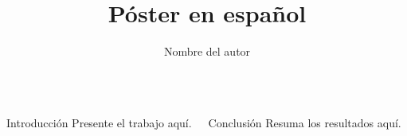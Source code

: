 \documentclass{beamer}
\title{Póster en español}
\author{Nombre del autor}
\begin{document}
\begin{frame}
\begin{columns}[t]
  \begin{block}{Introducción}
    Presente el trabajo aquí.
  \end{block}
  \begin{block}{Conclusión}
    Resuma los resultados aquí.
  \end{block}
\end{columns}
\end{frame}
\end{document}
